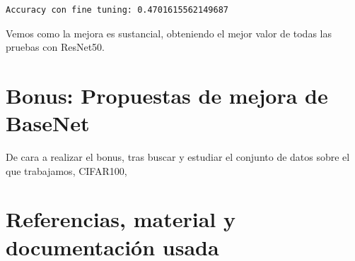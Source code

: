 \documentclass[12pt, spanish]{article}
\begin{document}
\begin{lstlisting}
Accuracy con fine tuning: 0.4701615562149687
\end{lstlisting}

Vemos como la mejora es sustancial, obteniendo el mejor valor de todas las pruebas con ResNet50.










\newpage

\section{Bonus: Propuestas de mejora de BaseNet}

De cara a realizar el bonus, tras buscar y estudiar el conjunto de datos sobre el que trabajamos\cite{cifar100bonus}, CIFAR100,









\newpage

\section{Referencias, material y documentación usada}
\end{document}
